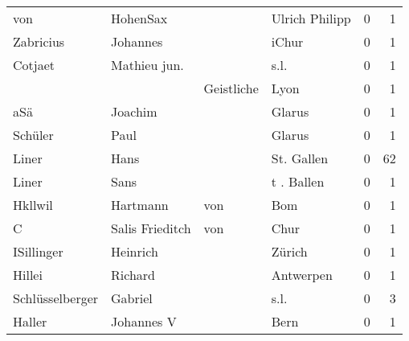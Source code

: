 \begin{center}
\begin{tiny}
\begin{longtabu}{llllrr}
                      von &                           HohenSax &             &                              Ulrich Philipp &          0 &         1 \\
                Zabricius &                           Johannes &             &                                       iChur &          0 &         1 \\
                  Cotjaet &                       Mathieu jun. &             &                                        s.l. &          0 &         1 \\
                          &                                    &  Geistliche &                                        Lyon &          0 &         1 \\
                      aSä &                            Joachim &             &                                      Glarus &          0 &         1 \\
                  Schüler &                               Paul &             &                                      Glarus &          0 &         1 \\
                    Liner &                               Hans &             &                                  St. Gallen &          0 &        62 \\
                    Liner &                               Sans &             &                                  t . Ballen &          0 &         1 \\
                  Hkllwil &                           Hartmann &         von &                                         Bom &          0 &         1 \\
                        C &                    Salis Frieditch &         von &                                        Chur &          0 &         1 \\
               ISillinger &                           Heinrich &             &                                      Zürich &          0 &         1 \\
                   Hillei &                            Richard &             &                                   Antwerpen &          0 &         1 \\
          Schlüsselberger &                            Gabriel &             &                                        s.l. &          0 &         3 \\
                   Haller &                         Johannes V &             &                                        Bern &          0 &         1 \\

\end{longtabu}
\end{tiny}
\end{center}

